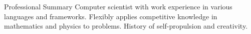 \begin{rSection}{Professional Summary}
	Computer scientist with work experience in various languages and frameworks. Flexibly applies competitive knowledge in mathematics and physics to problems. History of self-propulsion and creativity.
\end{rSection}
